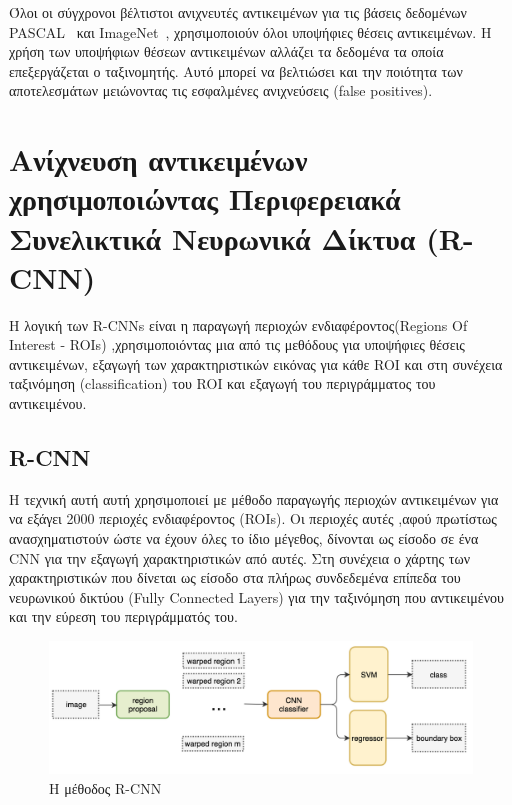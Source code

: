 Όλοι οι σύγχρονοι βέλτιστοι ανιχνευτές αντικειμένων για τις βάσεις δεδομένων
PASCAL~\cite{Everingham:2015:PVO:2725268.2725369} και ImageNet~\cite{DBLP:journals/corr/RussakovskyDSKSMHKKBBF14},
χρησιμοποιούν όλοι υποψήφιες θέσεις αντικειμένων.
Η χρήση των υποψήφιων θέσεων αντικειμένων αλλάζει τα δεδομένα τα οποία επεξεργάζεται
ο ταξινομητής. Αυτό μπορεί να βελτιώσει και την ποιότητα των αποτελεσμάτων
μειώνοντας τις εσφαλμένες ανιχνεύσεις (false positives).

\section{Ανίχνευση αντικειμένων χρησιμοποιώντας Περιφερειακά Συνελικτικά Νευρωνικά Δίκτυα (R-CNN)}\label{sec:objrcnn}

Η λογική των R-CNNs είναι η παραγωγή περιοχών ενδιαφέροντος(Regions Of Interest - ROIs)
,χρησιμοποιόντας μια από τις μεθόδους για υποψήφιες θέσεις αντικειμένων, εξαγωγή των χαρακτηριστικών
εικόνας για κάθε ROI και στη συνέχεια ταξινόμηση (classification) του ROI και
εξαγωγή του περιγράμματος του αντικειμένου.


\subsection{R-CNN}\label{sec:rcnn}
Η τεχνική αυτή αυτή χρησιμοποιεί με μέθοδο παραγωγής περιοχών αντικειμένων για να
εξάγει 2000 περιοχές ενδιαφέροντος (ROIs). Οι περιοχές αυτές ,αφού πρωτίστως
ανασχηματιστούν ώστε να έχουν όλες το ίδιο μέγεθος, δίνονται ως είσοδο σε ένα CNN
για την εξαγωγή χαρακτηριστικών από αυτές. Στη συνέχεια ο χάρτης των χαρακτηριστικών
που δίνεται ως είσοδο στα πλήρως συνδεδεμένα επίπεδα του νευρωνικού δικτύου
(Fully Connected Layers) για την ταξινόμηση που αντικειμένου και
την εύρεση του περιγράμματός του.

\begin{figure}[htbp]
  \begin{center}
    \includegraphics[width=0.8\maxwidth]{../figures/rcnn2.png}
    \caption{Η μέθοδος R-CNN\label{fig:rcnn}}
   \end{center}
\end{figure}


